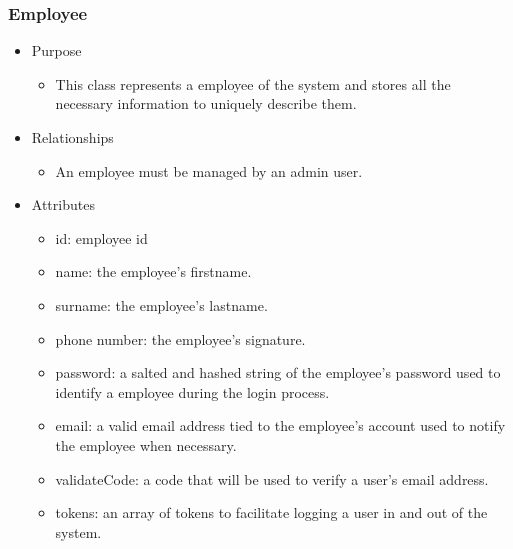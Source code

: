 \documentclass[hidelinks, 12pt, a4paper]{article}
\begin{document}
\begin{itemize}
    \subsubsection{Employee}
    \begin{itemize}
        \item Purpose
        \begin{itemize}
            \item This class represents a employee of the system and stores all the necessary information to uniquely describe them.
        \end{itemize}
        \item  Relationships
        \begin{itemize}
            \item An employee must be managed by an admin user.
        \end{itemize}
        \item Attributes
        \begin{itemize}
            \item id: employee id
            \item name: the employee's firstname.
            \item surname: the employee's lastname.
            \item phone number: the employee's signature.
            \item password: a salted and hashed string of the employee's password used to identify a employee during the login process.
            \item email: a valid email address tied to the employee's account used to notify the employee when necessary.
            \item validateCode: a code that will be used to verify a user's email address.
            \item tokens: an array of tokens to facilitate logging a user in and out of the system.

        \end{itemize}
    \end{itemize}


\end{itemize}
\end{document}
